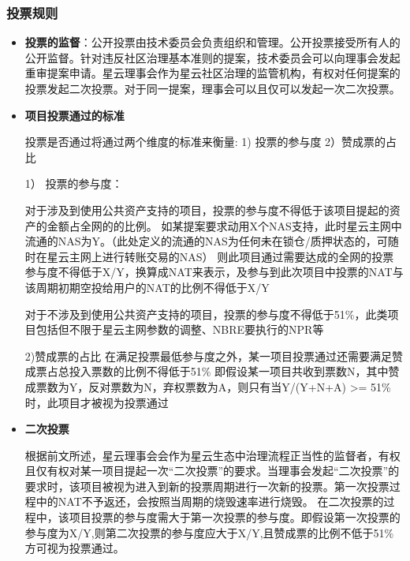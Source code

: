 \subsubsection{投票规则}

\begin{itemize}
	\item \textbf{投票的监督}：公开投票由技术委员会负责组织和管理。公开投票接受所有人的公开监督。针对违反社区治理基本准则的提案，技术委员会可以向理事会发起重审提案申请。星云理事会作为星云社区治理的监管机构，有权对任何提案的投票发起二次投票。对于同一提案，理事会可以且仅可以发起一次二次投票。
	\item \textbf{项目投票通过的标准}
	
	投票是否通过将通过两个维度的标准来衡量: 1) 投票的参与度 2）赞成票的占比

	1） 投票的参与度：

	对于涉及到使用公共资产支持的项目，投票的参与度不得低于该项目提起的资产的金额占全网的的比例。
	如某提案要求动用X个NAS支持，此时星云主网中流通的NAS为Y。（此处定义的流通的NAS为任何未在锁仓/质押状态的，可随时在星云主网上进行转账交易的NAS）
	则此项目通过需要达成的全网的投票参与度不得低于X/Y，换算成NAT来表示，及参与到此次项目中投票的NAT与该周期初期空投给用户的NAT的比例不得低于X/Y

	对于不涉及到使用公共资产支持的项目，投票的参与度不得低于51\%，此类项目包括但不限于星云主网参数的调整、NBRE要执行的NPR等

	2)赞成票的占比
	在满足投票最低参与度之外，某一项目投票通过还需要满足赞成票占总投入票数的比例不得低于51\%
	即假设某一项目共收到票数N，其中赞成票数为Y，反对票数为N，弃权票数为A，则只有当Y/(Y+N+A) >= 51\%时，此项目才被视为投票通过

	\item \textbf{二次投票}
	
	根据前文所述，星云理事会会作为星云生态中治理流程正当性的监督者，有权且仅有权对某一项目提起一次“二次投票”的要求。当理事会发起“二次投票”的要求时，该项目被视为进入到新的投票周期进行一次新的投票。第一次投票过程中的NAT不予返还，会按照当周期的烧毁速率进行烧毁。
	在二次投票的过程中，该项目投票的参与度需大于第一次投票的参与度。即假设第一次投票的参与度为X/Y,则第二次投票的参与度应大于X/Y,且赞成票的比例不低于51\%方可视为投票通过。
	 
\end{itemize}




